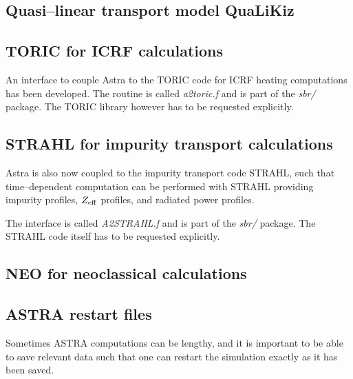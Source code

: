 \subsection{Quasi--linear transport model QuaLiKiz}

%
\subsection{TORIC for ICRF calculations}
An interface to couple Astra to the TORIC code for ICRF heating computations has
been developed. The routine is called {\it a2toric.f} and is part of the {\it sbr/} package. The TORIC library however has to be requested explicitly.
%
\subsection{STRAHL for impurity transport calculations}
Astra is also now coupled to the impurity transport code STRAHL, such that 
time--dependent computation can be performed with STRAHL providing impurity 
profiles, $Z_{\rm eff}$ profiles, and radiated power profiles.

The interface is called {\it A2STRAHL.f} and is part of the {\it sbr/} package. 
The STRAHL code itself has to be requested explicitly. 
%
\subsection{NEO for neoclassical calculations}

%
\subsection{ASTRA restart files}
Sometimes ASTRA computations can be lengthy, and it is important to be able to 
save relevant data such that one can restart the simulation exactly as it has 
been saved.

